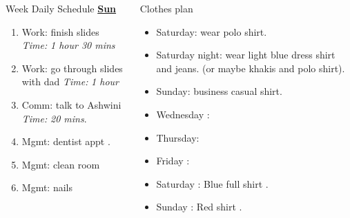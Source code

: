 \documentclass[serif, mathserif, final]{beamer}
\newcommand{\timeEst}[1]{\textit{Time:} \textit{#1}}
\begin{document}
\begin{frame}{}
\begin{columns}
\begin{column}{0.50\linewidth}
\begin{block}{Week Daily Schedule}
\textbf{\small \underline{Sun}}
\begin{enumerate} 
\tiny \item \tiny Work: finish slides \timeEst{1 hour 30 mins} 
\item \tiny Work: go through slides with dad \timeEst{1 hour} 
\item \tiny Comm: talk to Ashwini \timeEst{20 mins}. 
\item \tiny Mgmt: dentist appt .
\item \tiny Mgmt: clean room 
\item \tiny Mgmt: nails 
\end{enumerate} 
\end{block} 

\end{column}%

\begin{column}{0.20\linewidth}
  \begin{block}{Clothes plan} 
    \begin{itemize} 
      \tiny \item \tiny Saturday: wear polo shirt. 
    \item \tiny Saturday night: wear light blue dress shirt and jeans. (or maybe khakis and polo shirt). 
    \item \tiny Sunday: business casual shirt. 
    \item \tiny Wednesday : 
    \item \tiny Thursday: 
    \item \tiny Friday : 
    \item \tiny Saturday : Blue full shirt . 
    \item \tiny Sunday : Red shirt .
    \end{itemize} 
  \end{block}


\end{column}
\end{columns}
\end{frame}
\end{document}
